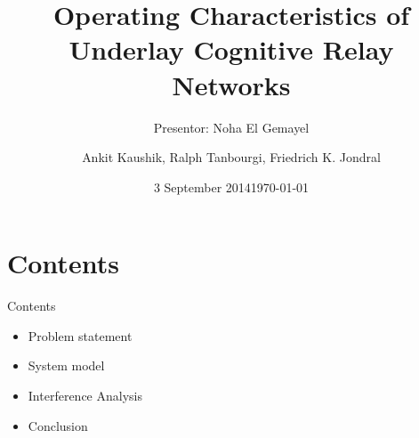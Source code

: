 \documentclass[12pt]{beamer}
\title[Operating Characteristics of Underlay Cognitive Relay Networks]{Operating Characteristics of Underlay Cognitive Relay Networks}
\subtitle{Presentor: Noha El Gemayel}
\author[Ankit.Kaushik@kit.edu]{Ankit Kaushik, Ralph Tanbourgi, Friedrich K. Jondral}%
\date{3 September 2014}
\date{\germandate\today}
\institute{Communications Engineering Lab}
\newcommand{\fs}[1]{\fontsize{ #1 pt}{8.2}\selectfont}
\begin{document}
\newcommand\FrameText[1]{%
  \begin{textblock*}{\paperwidth}(0pt,\textheight)
    \raggedright #1\hspace{.5em}
  \end{textblock*}}



\begin{frame}
	\titlepage
\end{frame}

\section{Contents}
\begin{frame}{Contents}
	\fontsize{10 pt}{15}\selectfont
	\begin{itemize}	
		\item Problem statement 
		\item System model 
		\item Interference Analysis 
		\item Conclusion 
	\end{itemize}
\end{frame}
\end{document}
